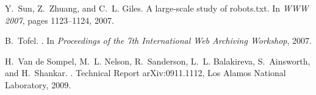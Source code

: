 \documentclass{ipres_proc_article-sp}
\begin{document}
\begin{thebibliography}{10}
Y.~Sun, Z.~Zhuang, and C.~L. Giles.
\newblock A large-scale study of robots.txt.
\newblock In {\em WWW 2007}, pages 1123--1124, 2007.

B.~Tofel.
.
\newblock In {\em Proceedings of the 7th International Web Archiving Workshop},
  2007.

H.~{Van de Sompel}, M.~L. Nelson, R.~Sanderson, L.~L. Balakireva, S.~Ainsworth,
  and H.~Shankar.
.
\newblock Technical Report arXiv:0911.1112, Los Alamos National Laboratory,
  2009.

\end{thebibliography}
\end{document}
